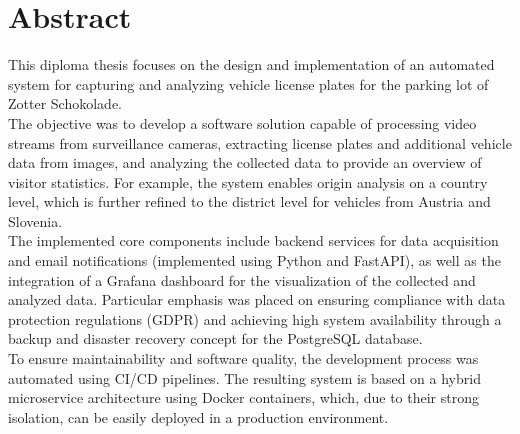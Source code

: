 \newpage


\section*{Abstract}
This diploma thesis focuses on the design and implementation of an automated system for capturing and analyzing vehicle license plates for the parking lot of Zotter Schokolade. \\
The objective was to develop a software solution capable of processing video streams from surveillance cameras, extracting license plates and additional vehicle data from images, and analyzing the collected data to provide an overview of visitor statistics.
For example, the system enables origin analysis on a country level, which is further refined to the district level for vehicles from Austria and Slovenia. \\
The implemented core components include backend services for data acquisition and email notifications (implemented using Python and FastAPI), as well as the integration of a Grafana dashboard for the visualization of the collected and analyzed data.
Particular emphasis was placed on ensuring compliance with data protection regulations (GDPR) and achieving high system availability through a backup and disaster recovery concept for the PostgreSQL database. \\
To ensure maintainability and software quality, the development process was automated using CI/CD pipelines.
The resulting system is based on a hybrid microservice architecture using Docker containers, which, due to their strong isolation, can be easily deployed in a production environment.

\newpage


